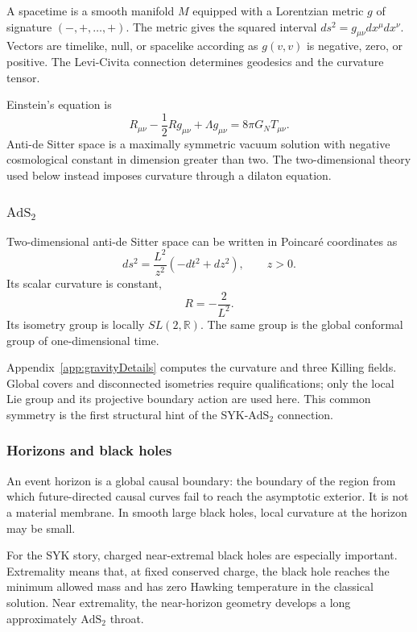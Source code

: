 \documentclass[11pt]{article}
\numberwithin{equation}{section}
\theoremstyle{exposition}
\theoremstyle{result}
\newcommand{\R}{\mathbb R}
\newcommand{\AdS}{\mathrm{AdS}}
\begin{document}
A spacetime is a smooth manifold $M$ equipped with a Lorentzian metric $g$ of signature $(-,+,\ldots,+)$. The metric gives the squared interval $ds^2=g_{\mu\nu}dx^\mu dx^\nu$. Vectors are timelike, null, or spacelike according as $g(v,v)$ is negative, zero, or positive. The Levi-Civita connection determines geodesics and the curvature tensor.

Einstein's equation is
\begin{equation}
R_{\mu\nu}-\frac12Rg_{\mu\nu}+\Lambda g_{\mu\nu}
=8\pi G_N T_{\mu\nu}.
\label{eq:Einstein}
\end{equation}
Anti-de Sitter space is a maximally symmetric vacuum solution with negative cosmological constant in dimension greater than two. The two-dimensional theory used below instead imposes curvature through a dilaton equation.

\subsubsection{$\AdS_2$}

Two-dimensional anti-de Sitter space can be written in Poincar\'e coordinates as
\begin{equation}
ds^2=\frac{L^2}{z^2}(-dt^2+dz^2),
\qquad z>0.
\label{eq:ads2}
\end{equation}
Its scalar curvature is constant,
\begin{equation*}
R=-\frac2{L^2}.
\end{equation*}
Its isometry group is locally $SL(2,\R)$. The same group is the global conformal group of one-dimensional time.

Appendix~\ref{app:gravityDetails} computes the curvature and three Killing fields. Global covers and disconnected isometries require qualifications; only the local Lie group and its projective boundary action are used here. This common symmetry is the first structural hint of the SYK-$\AdS_2$ connection.

\subsubsection{Horizons and black holes}

An event horizon is a global causal boundary: the boundary of the region from which future-directed causal curves fail to reach the asymptotic exterior. It is not a material membrane. In smooth large black holes, local curvature at the horizon may be small.

For the SYK story, charged near-extremal black holes are especially important. Extremality means that, at fixed conserved charge, the black hole reaches the minimum allowed mass and has zero Hawking temperature in the classical solution. Near extremality, the near-horizon geometry develops a long approximately $\AdS_2$ throat.
\end{document}

